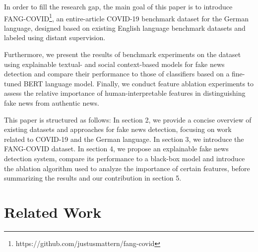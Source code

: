 \documentclass[11pt]{article}
\begin{document}
In order to fill the research gap, the main goal of this paper is to introduce FANG-COVID\footnote{https://github.com/justusmattern/fang-covid}, an entire-article COVID-19 benchmark dataset for the German language, designed based on existing English language benchmark datasets and labeled using distant supervision.

Furthermore, we present the results of benchmark experiments on the dataset using explainable textual- and social context-based models for fake news detection and compare their performance to those of classifiers based on a fine-tuned BERT language model. Finally, we conduct feature ablation experiments to assess the relative importance of human-interpretable features in distinguishing fake news from authentic news. 

This paper is structured as follows: In section 2, we provide a concise overview of existing datasets and approaches for fake news detection, focusing on work related to COVID-19 and the German language. In section 3, we introduce the FANG-COVID dataset. In section 4, we propose an explainable fake news detection system, compare its performance to a black-box model and introduce the ablation algorithm used to analyze the importance of certain features, before summarizing the results and our contribution in section 5.

\section{Related Work}
\end{document}
